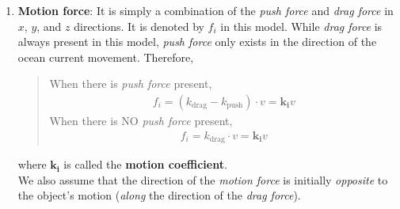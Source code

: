 \documentclass[a4paper,11pt]{article}
\begin{document}
\begin{spacing}{1.0}
\begin{enumerate}
	\item \textbf{Motion force}: It is simply a combination of the \textit{push force} and \textit{drag force} in $x$, $y$, and $z$ directions. It is denoted by $f_i$ in this model. While \textit{drag force} is always present in this model, \textit{push force} only exists in the direction of the ocean current movement. Therefore,
	\begin{quote}
		When there is \textit{push force} present, 
		\begin{align*}
		f_i = (k_\text{drag} - k_\text{push})\cdot v = \bm{k_i}v
		\end{align*}
		When there is NO \textit{push force} present,
		\begin{align*}
		f_i = k_\text{drag}\cdot v = \bm{k_i}v
		\end{align*}
	\end{quote}
	where $\bm{k_i}$ is called the \textbf{motion coefficient}.
	\\We also assume that the direction of the \textit{motion force} is initially \textit{opposite} to the object's motion (\textit{along} the direction of the \textit{drag force}).

\end{enumerate}



\end{spacing}
\end{document}
